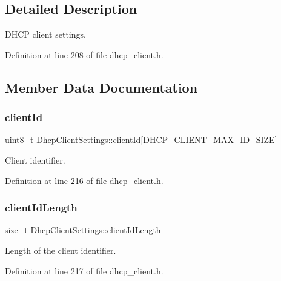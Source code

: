 \subsection{Detailed Description}
D\+H\+CP client settings. 

Definition at line 208 of file dhcp\+\_\+client.\+h.



\subsection{Member Data Documentation}
\mbox{\label{structDhcpClientSettings_af4ca035c3efcf3bf36bf341517990bf5}} 
\subsubsection{\texorpdfstring{client\+Id}{clientId}}
{\footnotesize\ttfamily \hyperlink{stdint_8h_aba7bc1797add20fe3efdf37ced1182c5}{uint8\+\_\+t} Dhcp\+Client\+Settings\+::client\+Id\mbox{[}\hyperlink{dhcp__client_8h_a59a4c964d4502c787d95da4f44e7ba92}{D\+H\+C\+P\+\_\+\+C\+L\+I\+E\+N\+T\+\_\+\+M\+A\+X\+\_\+\+I\+D\+\_\+\+S\+I\+ZE}\mbox{]}}



Client identifier. 



Definition at line 216 of file dhcp\+\_\+client.\+h.

\mbox{\label{structDhcpClientSettings_a9a6950d7dd613c04b2ab460aadd42e90}} 
\subsubsection{\texorpdfstring{client\+Id\+Length}{clientIdLength}}
{\footnotesize\ttfamily size\+\_\+t Dhcp\+Client\+Settings\+::client\+Id\+Length}



Length of the client identifier. 



Definition at line 217 of file dhcp\+\_\+client.\+h.


